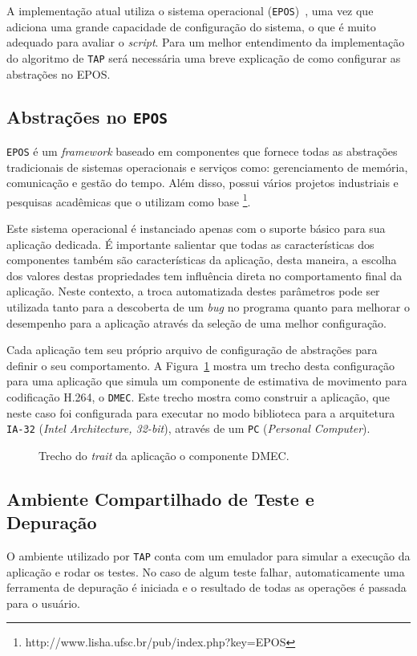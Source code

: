 \documentclass[conference]{IEEEtran}
\newcommand{\progcpp}[3][h]{
 \begin{figure}[#1]
     
   \caption{#3\label{progcpp:#2}}
 \end{figure}
}
\begin{document}
A implementação atual utiliza o sistema operacional (\texttt{EPOS})~\cite{Froehlich:2001}, uma vez que adiciona uma grande capacidade de configuração do sistema, o que é muito adequado para avaliar o \textit{script}. Para um melhor entendimento da implementação do algoritmo de \texttt{TAP} será necessária uma breve explicação de como configurar as abstrações no EPOS.

\subsection{Abstrações no \texttt{EPOS}}
\texttt{EPOS} é um \textit{framework} baseado em componentes que fornece todas as abstrações tradicionais de sistemas operacionais e serviços como: gerenciamento de memória, comunicação e gestão do tempo. Além disso, possui vários projetos industriais e pesquisas acadêmicas que o utilizam como base \footnote{http://www.lisha.ufsc.br/pub/index.php?key=EPOS}.

Este sistema operacional é instanciado apenas com o suporte básico para sua aplicação dedicada. É importante salientar que todas as características dos componentes também são características da aplicação, desta maneira, a escolha dos valores destas propriedades tem influência direta no comportamento final da aplicação. Neste contexto, a troca automatizada destes parâmetros pode ser utilizada tanto para a descoberta de um \textit{bug} no programa quanto para melhorar o desempenho para a aplicação através da seleção de uma melhor configuração.

Cada aplicação tem seu próprio arquivo de configuração de abstrações para definir o seu comportamento. A Figura~\ref{progcpp:trait_build} mostra um trecho desta configuração para uma aplicação que simula um componente de estimativa de movimento para codificação H.264, o \texttt{DMEC}. Este trecho mostra como construir a aplicação, que neste caso foi configurada para executar no modo biblioteca para a arquitetura \texttt{IA-32} (\textit{Intel Architecture, 32-bit}), através de um \texttt{PC} (\textit{Personal Computer}).

\progcpp{trait_build}{Trecho do \textit{trait} da aplicação o componente DMEC.}

\subsection{Ambiente Compartilhado de Teste e Depuração}
O ambiente utilizado por \texttt{TAP} conta com um emulador para simular a execução da aplicação e rodar os testes. No caso de algum teste falhar, automaticamente uma ferramenta de depuração é iniciada e o resultado de todas as operações é passada para o usuário.
\end{document}
